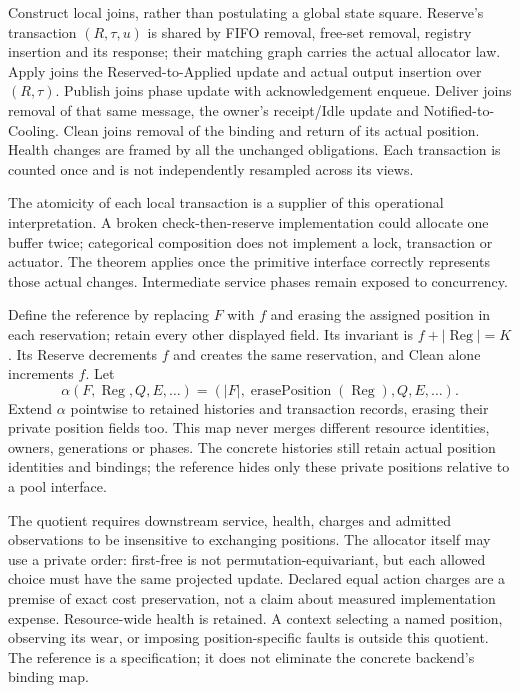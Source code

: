 \documentclass[11pt]{article}
\newcommand{\Reg}{\operatorname{Reg}}
\begin{document}
Construct local joins, rather than postulating a global state square. Reserve's transaction $(R,\tau,u)$ is shared by FIFO removal, free-set removal, registry insertion and its response; their matching graph carries the actual allocator law. Apply joins the Reserved-to-Applied update and actual output insertion over $(R,\tau)$. Publish joins phase update with acknowledgement enqueue. Deliver joins removal of that same message, the owner's receipt/Idle update and Notified-to-Cooling. Clean joins removal of the binding and return of its actual position. Health changes are framed by all the unchanged obligations. Each transaction is counted once and is not independently resampled across its views.

The atomicity of each local transaction is a supplier of this operational interpretation. A broken check-then-reserve implementation could allocate one buffer twice; categorical composition does not implement a lock, transaction or actuator. The theorem applies once the primitive interface correctly represents those actual changes. Intermediate service phases remain exposed to concurrency.

Define the reference by replacing $F$ with $f$ and erasing the assigned position in each reservation; retain every other displayed field. Its invariant is $f+|\Reg|=K$. Its Reserve decrements $f$ and creates the same reservation, and Clean alone increments $f$. Let
\[
 \alpha(F,\Reg,Q,E,\ldots)=(|F|,\operatorname{erasePosition}(\Reg),Q,E,\ldots).
 \tag{H}\label{eq:resource-projection}
\]
Extend $\alpha$ pointwise to retained histories and transaction records, erasing their private position fields too. This map never merges different resource identities, owners, generations or phases. The concrete histories still retain actual position identities and bindings; the reference hides only these private positions relative to a pool interface.

The quotient requires downstream service, health, charges and admitted observations to be insensitive to exchanging positions. The allocator itself may use a private order: first-free is not permutation-equivariant, but each allowed choice must have the same projected update. Declared equal action charges are a premise of exact cost preservation, not a claim about measured implementation expense. Resource-wide health is retained. A context selecting a named position, observing its wear, or imposing position-specific faults is outside this quotient. The reference is a specification; it does not eliminate the concrete backend's binding map.
\end{document}

